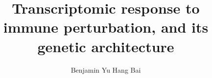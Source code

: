 \documentclass[draft,english,11pt,a4paper,twoside,openright]{book}
\begin{document}

\title{Transcriptomic response to immune perturbation, and its genetic architecture}
\author{Benjamin Yu Hang Bai}
\date{\DTMnow}

%
%
\frontmatter
%
%

% 

% 


%
%
\mainmatter
 


% 


%
% 

%
%
\backmatter



\end{document}
